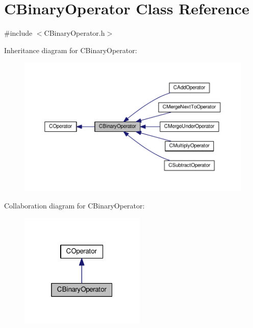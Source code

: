 \hypertarget{classCBinaryOperator}{}\section{C\+Binary\+Operator Class Reference}
\label{classCBinaryOperator}


{\ttfamily \#include $<$C\+Binary\+Operator.\+h$>$}



Inheritance diagram for C\+Binary\+Operator\+:\nopagebreak
\begin{figure}[H]
\begin{center}
\leavevmode
\includegraphics[width=350pt]{classCBinaryOperator__inherit__graph}
\end{center}
\end{figure}


Collaboration diagram for C\+Binary\+Operator\+:\nopagebreak
\begin{figure}[H]
\begin{center}
\leavevmode
\includegraphics[width=169pt]{classCBinaryOperator__coll__graph}
\end{center}
\end{figure}
